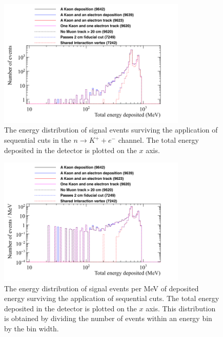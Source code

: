 \begin{figure}
  \centering
  \includegraphics[width=0.8\textwidth]{NucleonDecay_EnergyDepCuts_Raw_2cmCut}
  \caption[The energy distribution of signal events surviving the application of sequential cuts in the $n \rightarrow K^{+} + e^{-}$ channel]
          {The energy distribution of signal events surviving the application of sequential cuts in the $n \rightarrow K^{+} + e^{-}$ channel. The total energy deposited in the detector is plotted on the $x$ axis.}
  \label{fig:NDK_Sig_Raw}
\end{figure}

\begin{figure}
  \centering
  \includegraphics[width=0.8\textwidth]{NucleonDecay_EnergyDepCuts_Norm_2cmCut}
  \caption[The energy distribution of signal events per MeV of deposited energy surviving the application of sequential cuts]
          {The energy distribution of signal events per MeV of deposited energy surviving the application of sequential cuts. The total energy deposited in the detector is plotted on the $x$ axis. This distribution is obtained by dividing the number of events within an energy bin by the bin width.}
  \label{fig:NDK_Sig_Norm}
\end{figure}


